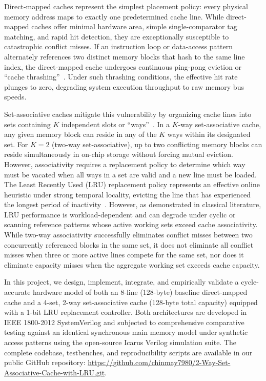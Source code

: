 \documentclass[conference]{IEEEtran}
\begin{document}
Direct-mapped caches represent the simplest placement policy: every physical memory address maps to exactly one predetermined cache line. While direct-mapped caches offer minimal hardware area, simple single-comparator tag matching, and rapid hit detection, they are exceptionally susceptible to catastrophic conflict misses. If an instruction loop or data-access pattern alternately references two distinct memory blocks that hash to the same line index, the direct-mapped cache undergoes continuous ping-pong eviction or ``cache thrashing''~\cite{jouppi1990improving, patterson2020riscv}. Under such thrashing conditions, the effective hit rate plunges to zero, degrading system execution throughput to raw memory bus speeds.

Set-associative caches mitigate this vulnerability by organizing cache lines into sets containing $K$ independent slots or ``ways''~\cite{smith1982cache}. In a $K$-way set-associative cache, any given memory block can reside in any of the $K$ ways within its designated set. For $K=2$ (two-way set-associative), up to two conflicting memory blocks can reside simultaneously in on-chip storage without forcing mutual eviction. However, associativity requires a replacement policy to determine which way must be vacated when all ways in a set are valid and a new line must be loaded. The Least Recently Used (LRU) replacement policy represents an effective online heuristic under strong temporal locality, evicting the line that has experienced the longest period of inactivity~\cite{smith1983instruction}. However, as demonstrated in classical literature, LRU performance is workload-dependent and can degrade under cyclic or scanning reference patterns whose active working sets exceed cache associativity. While two-way associativity successfully eliminates conflict misses between two concurrently referenced blocks in the same set, it does not eliminate all conflict misses when three or more active lines compete for the same set, nor does it eliminate capacity misses when the aggregate working set exceeds cache capacity.

In this project, we design, implement, integrate, and empirically validate a cycle-accurate hardware model of both an 8-line (128-byte) baseline direct-mapped cache and a 4-set, 2-way set-associative cache (128-byte total capacity) equipped with a 1-bit LRU replacement controller. Both architectures are developed in IEEE 1800-2012 SystemVerilog and subjected to comprehensive comparative testing against an identical synchronous main memory model under synthetic access patterns using the open-source Icarus Verilog simulation suite. The complete codebase, testbenches, and reproducibility scripts are available in our public GitHub repository: \url{https://github.com/chinmay7980/2-Way-Set-Associative-Cache-with-LRU.git}.
\end{document}
